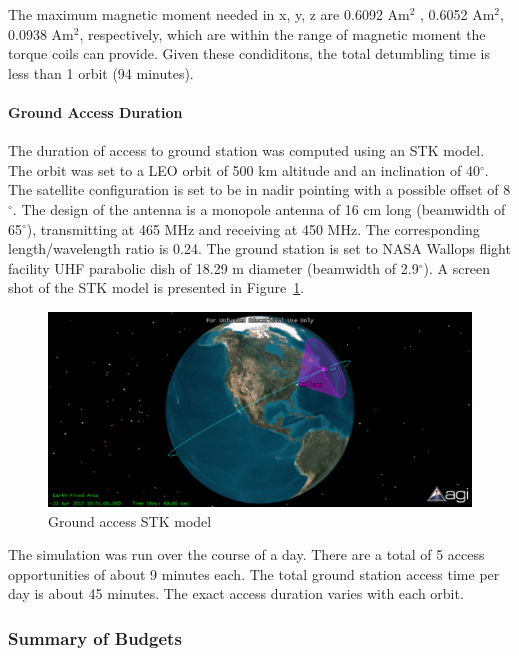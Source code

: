 \documentclass[12pt]{article}
\begin{document}
			The maximum magnetic moment needed in x, y, z are 0.6092 Am$^2$ , 0.6052 Am$^2$, 0.0938 Am$^2$, respectively, which are within the range of magnetic moment the torque coils can provide. Given these condiditons, the total detumbling time is less than 1 orbit (94 minutes). 

			\paragraph{Ground Access Duration}
			The duration of access to ground station was computed using an STK model. The orbit was set to a LEO orbit of 500 km altitude and an inclination of 40$^\circ$. The satellite configuration is set to be in nadir pointing with a possible offset of 8$^\circ$. The design of the antenna is a monopole antenna of 16 cm long (beamwidth of 65$^\circ$), transmitting at 465 MHz and receiving at 450 MHz. The corresponding length/wavelength ratio is 0.24. The ground station is set to NASA Wallops flight facility UHF parabolic dish of 18.29 m diameter (beamwidth of 2.9$^\circ$). A screen shot of the STK model is presented in Figure~\ref{fig:ADCS_STK}. 

			\begin{figure}[!ht]
				\centering
				\includegraphics[scale=0.8]{images/ADCS_STK.png}
				\caption{Ground access STK model}
				\label{fig:ADCS_STK}
			\end{figure}

			The simulation was run over the course of a day. There are a total of 5 access opportunities of about 9 minutes each. The total ground station access time per day is about 45 minutes. The exact access duration varies with each orbit. 

			\subsubsection{Summary of Budgets}
\end{document}
